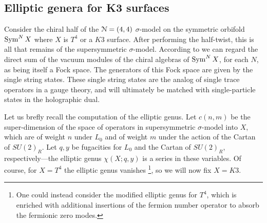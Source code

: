 \documentclass[../main.tex]{subfiles}
\begin{document}
%


\subsection{Elliptic genera for K3 surfaces}

Consider the chiral half of the $\mathcal N= (4,4)$ $\sigma$-model on the symmetric orbifold  $\operatorname{Sym}^N X$ where $X$ is $T^4$ or a $K3$ surface. 
After performing the half-twist, this is all that remains of the supersymmetric $\sigma$-model.
 According to \cite{DMVV} we can regard the direct sum of the vacuum modules of the chiral algebras of $\operatorname{Sym}^N X$, for each $N$, as being itself a Fock space. The generators of this Fock space are given by the single string states. These single string states are the analog of single trace operators in a gauge theory, and will ultimately be matched with single-particle states in the holographic dual.

Let us brefly recall the computation of the elliptic genus. Let $c(n,m)$ be the super-dimension of the space of operators in supersymmetric $\sigma$-model into $X$, which are of weight $n$ under $L_0$ and of weight $m$ under the action of the Cartan of $SU(2)_R$.  
Let $q,y$ be fugacities for $L_0$ and the Cartan of $SU(2)_R$, respectively---the elliptic genus $\chi(X;q,y)$ is a series in these variables.  
Of course, for $X = T^4$ the elliptic genus vanishes \footnote{One could instead consider the modified elliptic genus for $T^4$, which is enriched with additional insertions of the fermion number operator to absorb the fermionic zero modes.}, so we will now fix $X = K3$.
\end{document}
